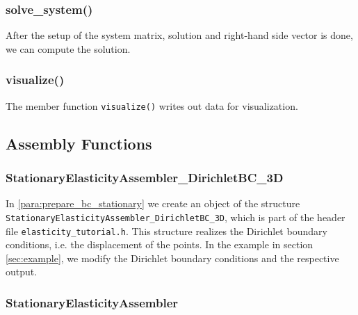 \documentclass[a4paper, 11pt, twoside]{article}
\theoremstyle{plain}
\theoremstyle{definition}
\begin{document}

\subsubsection{solve\_system()}

After the setup of the system matrix, solution and right-hand side vector is done, we can compute the solution.





\subsubsection{visualize()}

The member function \verb'visualize()' writes out data for visualization.




\subsection{Assembly Functions}
\label{ssec:Assembly_Functions}


\subsubsection{StationaryElasticityAssembler\_DirichletBC\_3D}
\label{sssec:StationaryElasticityAssemblerDirichletBC3D}

In \ref{para:prepare_bc_stationary} we create an object of the structure \verb'StationaryElasticityAssembler_DirichletBC_3D', which is part of the header file \verb'elasticity_tutorial.h'.
This structure realizes the Dirichlet boundary conditions, i.e. the displacement of the points.
In the example in section \ref{sec:example}, we modify the Dirichlet boundary conditions and the respective output.







\subsubsection{StationaryElasticityAssembler}
\label{sssec:StationaryElasticityAssembler}
\end{document}
